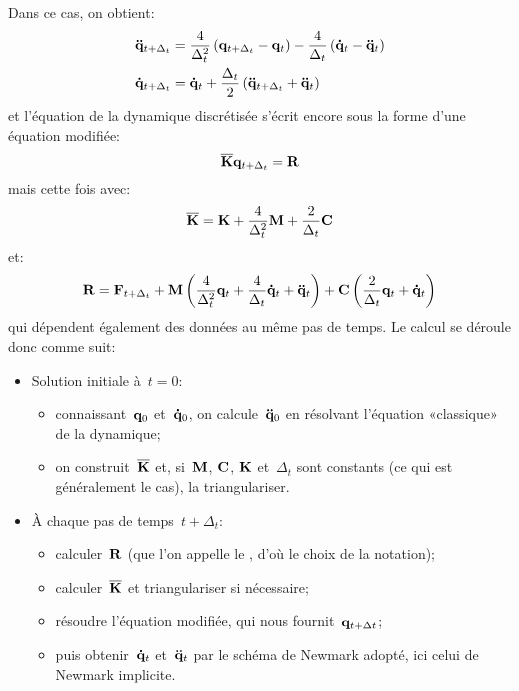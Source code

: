 Dans ce cas, on obtient:
\begin{equation}
\begin{aligned}
&\VV{\ddot q}_{t+\Delta_t} = \frac4{\Delta_t^2} \left( \VV{q}_{t+\Delta_t} -\VV{q}_t\right)
-\frac4{\Delta_t}\left( \VV{\dot q}_t - \VV{\ddot q}_t\right)\\
&\VV{\dot q}_{t+\Delta_t} = \VV{\dot q}_t + \frac{\Delta_t}2\left( \VV{\ddot q}_{t+\Delta_t} + \VV{\ddot q}_t\right)
\end{aligned}
\end{equation}
et l'équation de la dynamique discrétisée s'écrit encore sous la forme d'une équation modifiée:
\begin{equation}
\MM{\overline{K}} \VV{q}_{t+\Delta_t} = \VV{R}
\end{equation}
mais cette fois avec:
\begin{equation}
\MM{\overline{K}} = \MM{K}+\frac4{\Delta_t^2}\MM{M}+\frac2{\Delta_t}\MM{C}
\end{equation}
et:
\begin{equation}
\VV{R} = \VV{F}_{t+\Delta_t} + \MM{M}\left(\frac4{\Delta_t^2}\VV{q}_t + \frac4{\Delta_t}\VV{\dot q}_t
+ \VV{\ddot q}_t\right)
+\MM{C}\left( \frac2{\Delta_t}\VV{q}_t + \VV{\dot q}_t\right)
\end{equation}
qui dépendent également des données au même pas de temps.
\medskipvm
Le calcul se déroule donc comme suit:
\begin{itemize}
  \item Solution initiale à~$t=0$:
	\begin{itemize}
	\item connaissant~$\VV{q}_0$ et~$\VV{\dot q}_0$, on calcule~$\VV{\ddot q}_0$ en résolvant
	l'équation «classique» de la dynamique;
	\item on construit~$\MM{\overline{K}}$ et, si~$\MM{M}$, $\MM{C}$, $\MM{K}$ et~$\Delta_t$ sont constants
	(ce qui est généralement le cas), la triangulariser.
	\end{itemize}
  \item À chaque pas de temps~$t+\Delta_t$:
	\begin{itemize}
	\item calculer~$\VV{R}$ (que l'on appelle le , d'où le choix de la notation);
	\item calculer~$\MM{\overline{K}}$ et triangulariser si nécessaire;
	\item résoudre l'équation modifiée, qui nous fournit~$\VV{q}_{t+\Delta t}$;
	\item puis obtenir~$\VV{\dot q}_t$ et~$\VV{\ddot q}_t$ par le schéma de Newmark adopté,
	ici celui de Newmark implicite.
	\end{itemize}
\end{itemize}
